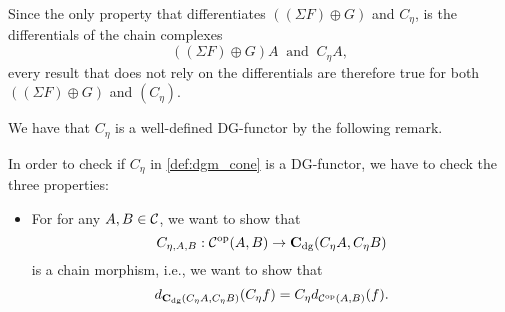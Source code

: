 \begin{remark}
    \label{rem:dgm_c_eta_similar_to_sigma_f_plus_g}
    Since the only property that differentiates \( ((\Sigma F) \oplus G) \) and \( C_{\eta} \), is the differentials of the chain complexes
    \[
        ((\Sigma F) \oplus G) A \: \text{ and } \: C_{\eta} A,
    \]
    every result that does not rely on the differentials are therefore true for both \( ((\Sigma F) \oplus G)\) and \( (C_{\eta}) \).
\end{remark}

We have that \( C_{\eta} \) is a well-defined DG-functor by the following remark.
\begin{remark}
    In order to check if \( C_{\eta} \) in \autoref{def:dgm_cone} is a DG-functor, we have to check the three properties:
    \begin{itemize}
        \item {
            For for any \( A, B \in {\mathcal{C}} \), we want to show that
            \[
                C_{\eta, A, B}: {\mathcal{C}}^{\operatorname{op}}(A, B) \to \operatorname{\mathbf{C}}_{\operatorname{dg}}(C_{\eta} A, C_{\eta} B)
            \]
            is a chain morphism, i.e., we want to show that
            \[
                d_{\operatorname{\mathbf{C}}_{\operatorname{dg}}(C_{\eta} A, C_{\eta} B)}(C_{\eta} f) = C_{\eta} d_{{\mathcal{C}}^{\operatorname{op}}(A, B)}(f).
            \]

}
\end{itemize}
\end{remark}
